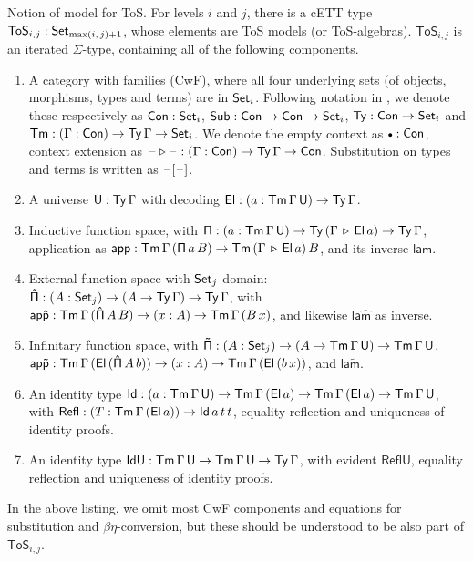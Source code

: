 \documentclass{llncs}
\newcommand{\ToS}{\mathsf{ToS}}
\newcommand{\ext}{\triangleright}
\newcommand{\emptycon}{\scaleobj{.75}\bullet}
\newcommand{\Pii}{\mathsf{\Pi}}
\newcommand{\appi}{\mathsf{app}}
\newcommand{\lami}{\mathsf{lam}}
\newcommand{\Pie}{\mathsf{\hat{\Pi}}}
\newcommand{\appe}{\mathsf{ap\hat{p}}}
\newcommand{\lame}{\mathsf{la\hat{m}}}
\newcommand{\Piinf}{\mathsf{\tilde{\Pi}}}
\newcommand{\appinf}{\mathsf{ap\tilde{p}}}
\newcommand{\laminf}{\mathsf{la\tilde{m}}}
\newcommand{\Refl}{\mathsf{Refl}}
\newcommand{\IdU}{\mathsf{IdU}}
\newcommand{\ReflU}{\mathsf{ReflU}}
\begin{document}
\begin{nidefinition}{Notion of model for ToS.}\label{def:tos}
For levels $i$ and $j$, there is a cETT type $\ToS_{i,j} : \Set_{\max(i,\,j)+1}$, whose elements are
ToS models (or ToS-algebras). $\ToS_{i,j}$ is an iterated $\Sigma$-type, containing
all of the following components.
\begin{enumerate}
\item
  A category with families (CwF), where all four underlying sets (of
  objects, morphisms, types and terms) are in $\mathsf{Set}_i$. Following notation in
  \cite{TODO}, we denote these respectively as $\mathsf{Con} : \mathsf{Set}_i$, $\mathsf{Sub} : \mathsf{Con} \rightarrow
  \mathsf{Con} \rightarrow \mathsf{Set}_i$, $\mathsf{Ty} : \mathsf{Con} \rightarrow \mathsf{Set}_i$ and $\mathsf{Tm} : (\Gamma : \mathsf{Con}) \rightarrow
  \mathsf{Ty}\,\Gamma \rightarrow \mathsf{Set}_i$. We denote the empty context as $\emptycon : \Con$,
  context extension as $\blank\ext\blank : (\Gamma : \Con)\ra \Ty\,\Gamma \ra \Con$.
  Substitution on types and terms is written as $\mathord{\hspace{1pt}\text{--}\hspace{1pt}}[\mathord{\hspace{1pt}\text{--}\hspace{1pt}}]$.
\item
  A universe $\mathsf{U} : \mathsf{Ty}\,\Gamma$ with decoding $\mathsf{El} : (a : \mathsf{Tm}\,\Gamma\,\mathsf{U}) \rightarrow
  \mathsf{Ty}\,\Gamma$.
\item
  Inductive function space, with $\Pii : (a : \Tm\,\Gamma\,\U) \ra
  \Ty\,(\Gamma\,\ext\,\El\,a) \ra \Ty\,\Gamma$, application as $\appi :
  \Tm\,\Gamma\,(\Pii\,a\,B)\ra \Tm\,(\Gamma\,\ext\,\El\,a)\,B$, and its inverse
  $\lami$.
\item
  External function space with $\mathsf{Set}_j$ domain: $\Pie : (A : \Set_j)\ra(A \ra
  \Ty\,\Gamma)\ra \Ty\,\Gamma$, with $\appe : \Tm\,\Gamma\,(\Pie\,A\,B)\ra(x :
  A)\ra \Tm\,\Gamma\,(B\,x)$, and likewise $\lame$ as inverse.
\item
  Infinitary function space, with $\Piinf : (A : \Set_j)\ra(A \ra
  \Tm\,\Gamma\,\U)\ra \Tm\,\Gamma\,\U$, $\appinf :
  \Tm\,\Gamma\,(\El\,(\Pie\,A\,b))\ra(x : A)\ra \Tm\,\Gamma\,(\El\,(b\,x))$, and
  $\laminf$.
\item
  An identity type $\mathsf{Id} : (a : \mathsf{Tm}\,\Gamma\,\mathsf{U})\rightarrow
  \mathsf{Tm}\,\Gamma\,(\mathsf{El}\,a)\rightarrow\mathsf{Tm}\,\Gamma\,(\mathsf{El}\,a)\rightarrow \mathsf{Tm}\,\Gamma\,\mathsf{U}$, with
  $\Refl : (T : \Tm\,\Gamma\,(\El\,a))\ra \Id\,a\,t\,t$, equality reflection
  and uniqueness of identity proofs.
\item
  An identity type $\IdU : \Tm\,\Gamma\,\U \ra \Tm\,\Gamma\,\U \ra \Ty\,\Gamma$, with
  evident $\ReflU$, equality reflection and uniqueness of identity proofs.
\end{enumerate}
\end{nidefinition}
In the above listing, we omit most CwF components and equations for substitution and
$\beta\eta$-conversion, but these should be understood to be also part of $\ToS_{i,j}$.
\end{document}
